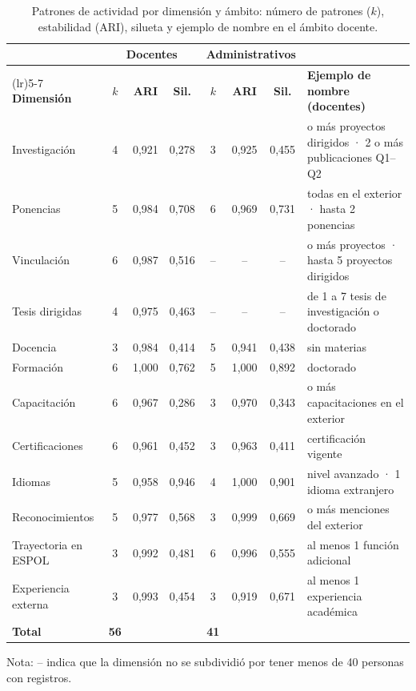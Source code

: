 \begin{table}[!htbp]
    \centering
    \caption{Patrones de actividad por dimensión y ámbito: número de patrones ($k$), estabilidad (ARI), silueta y ejemplo de nombre en el ámbito docente.}
    \label{tab:patrones}
    \footnotesize
    \begin{tabular}{>{\raggedright\arraybackslash}p{2.7cm} c c c c c c >{\raggedright\arraybackslash}p{5.0cm}}
        \toprule
        & \multicolumn{3}{c}{\textbf{Docentes}} & \multicolumn{3}{c}{\textbf{Administrativos}} & \\
        \cmidrule(lr){2-4} \cmidrule(lr){5-7}
        \textbf{Dimensión} & $k$ & \textbf{ARI} & \textbf{Sil.} & $k$ & \textbf{ARI} & \textbf{Sil.} & \textbf{Ejemplo de nombre (docentes)} \\
        \midrule
        Investigación & 4 & 0,921 & 0,278 & 3 & 0,925 & 0,455 & 2 o más proyectos dirigidos · 2 o más publicaciones Q1--Q2 \\
        Ponencias & 5 & 0,984 & 0,708 & 6 & 0,969 & 0,731 & todas en el exterior · hasta 2 ponencias \\
        Vinculación & 6 & 0,987 & 0,516 & -- & -- & -- & 8 o más proyectos · hasta 5 proyectos dirigidos \\
        Tesis dirigidas & 4 & 0,975 & 0,463 & -- & -- & -- & de 1 a 7 tesis de investigación o doctorado \\
        Docencia & 3 & 0,984 & 0,414 & 5 & 0,941 & 0,438 & sin materias \\
        Formación & 6 & 1,000 & 0,762 & 5 & 1,000 & 0,892 & doctorado \\
        Capacitación & 6 & 0,967 & 0,286 & 3 & 0,970 & 0,343 & 5 o más capacitaciones en el exterior \\
        Certificaciones & 6 & 0,961 & 0,452 & 3 & 0,963 & 0,411 & 1 certificación vigente \\
        Idiomas & 5 & 0,958 & 0,946 & 4 & 1,000 & 0,901 & nivel avanzado · 1 idioma extranjero \\
        Reconocimientos & 5 & 0,977 & 0,568 & 3 & 0,999 & 0,669 & 4 o más menciones del exterior \\
        Trayectoria en ESPOL & 3 & 0,992 & 0,481 & 6 & 0,996 & 0,555 & al menos 1 función adicional \\
        Experiencia externa & 3 & 0,993 & 0,454 & 3 & 0,919 & 0,671 & al menos 1 experiencia académica \\
        \midrule
        \textbf{Total} & \textbf{56} & & & \textbf{41} & & & \\
        \bottomrule
    \end{tabular}
    \par\smallskip
    \raggedright\footnotesize Nota: -- indica que la dimensión no se subdividió por tener menos de 40 personas con registros.
\end{table}

